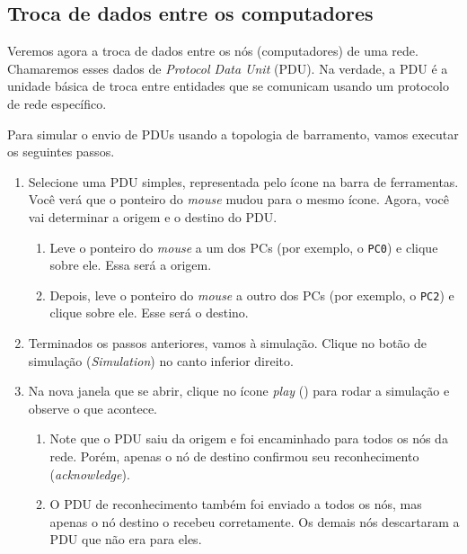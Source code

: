 \subsection{Troca de dados entre os computadores}\label{subsec:trocaPDUs}
Veremos agora a troca de dados entre os nós (computadores) de uma rede. Chamaremos esses dados de \textit{Protocol Data Unit} (PDU). Na verdade, a PDU é a unidade básica de troca entre entidades que se comunicam usando um protocolo de rede específico.

Para simular o envio de PDUs usando a topologia de barramento, vamos executar os seguintes passos.

\begin{enumerate}[label*=\arabic*.]\label{enum:envioPDU}
    \item Selecione uma PDU simples, representada pelo ícone  na barra de ferramentas. Você verá que o ponteiro do \textit{mouse} mudou para o mesmo ícone. Agora, você vai determinar a origem e o destino do PDU.
    \begin{enumerate}[label*=\arabic*.]
        \item Leve o ponteiro do \textit{mouse} a um dos PCs (por exemplo, o \texttt{PC0}) e clique sobre ele. Essa será a origem.
        \item Depois, leve o ponteiro do \textit{mouse} a outro dos PCs (por exemplo, o \texttt{PC2}) e clique sobre ele. Esse será o destino.
    \end{enumerate}
    
    \item Terminados os passos anteriores, vamos à simulação. Clique no botão de simulação (\textit{Simulation}) no canto inferior direito.

    \item Na nova janela que se abrir, clique no ícone \textit{play} (\faPlay) para rodar a simulação e observe o que acontece.
    \begin{enumerate}[label*=\arabic*.]
        \item Note que o PDU saiu da origem e foi encaminhado para todos os nós da rede. Porém, apenas o nó de destino confirmou seu reconhecimento (\textit{acknowledge}).
        \item O PDU de reconhecimento também foi enviado a todos os nós, mas apenas o nó destino o recebeu corretamente. Os demais nós descartaram a PDU que não era para eles.
     \end{enumerate}
\end{enumerate}

